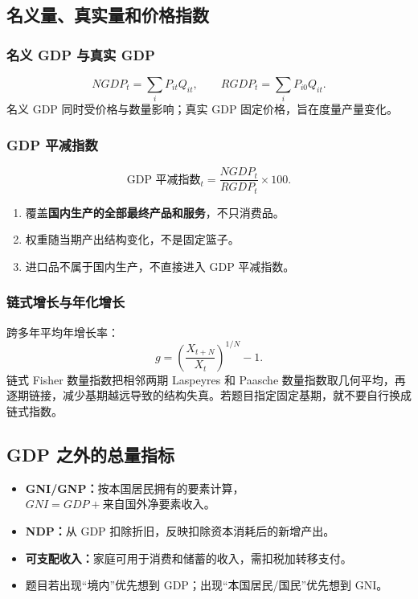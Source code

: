 \documentclass[UTF8,11pt,a4paper]{ctexart}
\newcommand{\term}[1]{\textbf{#1}}
\begin{document}
\subsection{名义量、真实量和价格指数}
\subsubsection{名义 GDP 与真实 GDP}
\[
NGDP_t=\sum_i P_{it}Q_{it},
\qquad
RGDP_t=\sum_i P_{i0}Q_{it}.
\]
名义 GDP 同时受价格与数量影响；真实 GDP 固定价格，旨在度量产量变化。

\subsubsection{GDP 平减指数}
\[
\text{GDP 平减指数}_t=\frac{NGDP_t}{RGDP_t}\times100.
\]
\begin{detailbox}[三个要点]
\begin{enumerate}
  \item 覆盖\term{国内生产的全部最终产品和服务}，不只消费品。
  \item 权重随当期产出结构变化，不是固定篮子。
  \item 进口品不属于国内生产，不直接进入 GDP 平减指数。
\end{enumerate}
\end{detailbox}

\subsubsection{链式增长与年化增长}
跨多年平均年增长率：
\[
g=\left(\frac{X_{t+N}}{X_t}\right)^{1/N}-1.
\]
链式 Fisher 数量指数把相邻两期 Laspeyres 和 Paasche 数量指数取几何平均，再逐期链接，减少基期越远导致的结构失真。若题目指定固定基期，就不要自行换成链式指数。

\subsection{GDP 之外的总量指标}
\begin{itemize}
  \item \term{GNI/GNP：}按本国居民拥有的要素计算，$GNI=GDP+\text{来自国外净要素收入}$。
  \item \term{NDP：}从 GDP 扣除折旧，反映扣除资本消耗后的新增产出。
  \item \term{可支配收入：}家庭可用于消费和储蓄的收入，需扣税加转移支付。
  \item 题目若出现“境内”优先想到 GDP；出现“本国居民/国民”优先想到 GNI。
\end{itemize}
\end{document}
